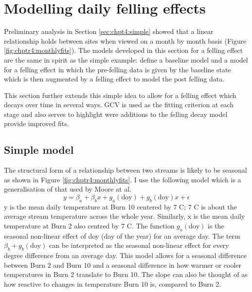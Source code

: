 



\section{Modelling daily felling effects}

Preliminary analysis in Section \ref{sec:chpt4:simple} showed that a linear relationship holds between sites when viewed on a month by month basis (Figure \ref{fig:chptr4:monthlyfits}). The models developed in this section for a felling effect are the same in spirit as the simple example: define a baseline model and a model for a felling effect in which the pre-felling data is given by the baseline state which is then augmented by a felling effect to model the post felling data.

This section further extends this simple idea to allow for a felling effect which decays over time in several ways.  GCV is used as the fitting criterion at each stage and also serves to highlight were additions to the felling decay model provide improved fits.




\subsection{Simple model}


The structural form of a relationship between two streams is likely to be seasonal as shown in Figure \ref{fig:chptr4:monthlyfits}.  I use the following model which is a generalisation of that used by Moore at al.
\begin{equation}
  y = \beta_a + \beta_b x + g_a(\text{doy}) + g_b(\text{doy})x + \epsilon
\end{equation}
y is the mean daily temperature at Burn 10 centered by 7 \degrees C; 7 \degrees C is about the average stream temperature across the whole year. Similarly, x is the mean daily temperature at Burn 2 also centred by 7 \degrees C. The function $g_a(\text{doy})$ is the seasonal non-linear effect of doy (day of the year) for an average day.  The term $\beta_b + g_b(\text{doy})$ can be interpreted as the seasonal non-linear effect for every degree difference from an average day.  This model allows for a seasonal difference between Burn 2 and Burn 10 and a seasonal difference in how warmer or cooler temperatures in Burn 2 translate to Burn 10. The slope can also be thought of as how reactive to changes in temperature Burn 10 is, compared to Burn 2.

